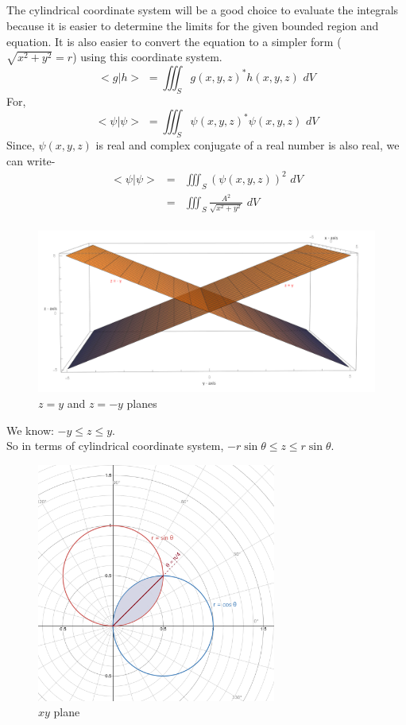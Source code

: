 \documentclass{article}
\begin{document}
\subsection{}%
\large{
The cylindrical coordinate system will be a good choice to evaluate the integrals because it is easier to determine the limits for the given bounded region and equation. It is also easier to convert the equation to a simpler form ($\sqrt{x^2 + y^2} = r$) using this coordinate system.
$$<g|h> \,\,= \iiint_S g(x,y,z)^{*}h(x,y,z) \,\, dV $$
For,
$$<\psi|\psi> \,\, = \iiint_S \psi(x,y,z)^{*}\psi(x,y,z) \,\, dV $$
Since, $\psi(x,y,z)$ is real and complex conjugate of a real number is also real, we can write-
\begin{eqnarray*}
        <\psi|\psi> &=& \iiint_S (\psi(x,y,z))^2 \,\, dV\\
        &=&\iiint_S \frac{A^2}{\sqrt{x^2+y^2}} \,\, dV\\
\end{eqnarray*}

\newpage
\begin{figure}[h]
    \centering
    \includegraphics[width=1.0\textwidth]{2-b(i).png}
    \caption{$z=y$ and $z=-y$ planes}
\end{figure}

We know: $-y  \leq z \leq y$.\\
So in terms of cylindrical coordinate system, $ -r\sin\theta \leq z \leq r\sin\theta$.

\newpage
\begin{figure}[h]
    \centering
    \includegraphics[width=0.7\textwidth]{2-b(ii).png}
    \caption{$xy$ plane}
\end{figure}

}
\end{document}
